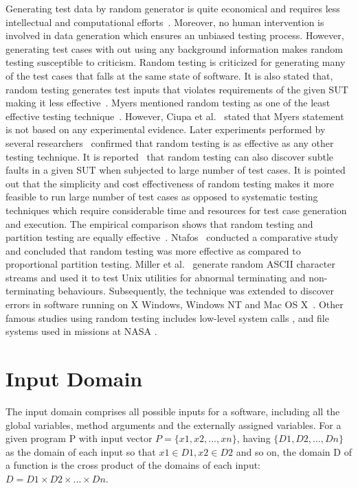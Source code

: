 Generating test data by random generator is quite economical and requires less intellectual and computational efforts~\cite{ciupa2008artoo}. Moreover, no human intervention is involved in data generation which ensures an unbiased testing process. However, generating test cases with out using any background information makes random testing susceptible to criticism. Random testing is criticized for generating many of the test cases that falls at the same state of software. It is also stated that, random testing generates test inputs that violates requirements of the given SUT making it less effective~\cite{pacheco2009directed, sen2007effective}. Myers mentioned random testing as one of the least effective testing technique~\cite{myers2011art}. However, Ciupa et al.~\cite{ciupa2007experimental} stated that Myers statement is not based on any experimental evidence. Later experiments performed by several researchers~\cite{ciupa2008finding, hamlet1994random,  leitner2007efficient, duran1981report} confirmed that random testing is as effective as any other testing technique. It is reported~\cite{duran1981report} that random testing can also discover subtle faults in a given SUT when subjected to large number of test cases. It is pointed out that the simplicity and cost effectiveness of random testing makes it more feasible to run large number of test cases as opposed to systematic testing techniques which require considerable time and resources for test case generation and execution. The empirical comparison shows that random testing and partition testing are equally effective~\cite{hamlet1990partition}. Ntafos~\cite{ntafos1998random} conducted a comparative study and concluded that random testing was more effective as compared to proportional partition testing. Miller et al.~\cite{miller1990empirical} generate random ASCII character streams and used it to test Unix utilities for abnormal terminating and non-terminating behaviours. Subsequently, the technique was extended to discover errors in software running on X Windows, Windows NT and Mac OS X~\cite{forrester2000empirical, miller2006empirical}. Other famous studies using random testing includes low-level system calls \cite{kropp1998automated}, and file systems used in missions at NASA \cite{groce2007randomized}.






\section{Input Domain} 
The input domain comprises all possible inputs for a software, including all the global variables, method arguments and the externally assigned variables. For a given program P with input vector $ P =\{x1, x2, . . . , xn\}$, having $\{D1, D2, . . . , Dn\}$ as the domain of each input so that $x1 \in D1, x2 \in D2$ and so on, the domain D of a function is the cross product of the domains of each input: $D = D1 \times D2 \times . . . \times Dn$.

